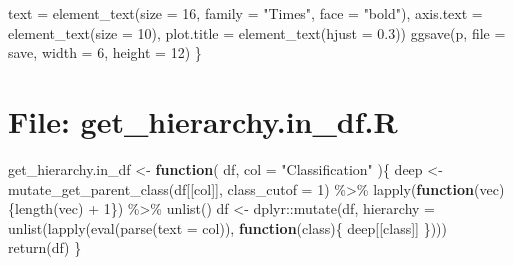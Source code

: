 \documentclass[
]{article}
\newenvironment{Shaded}{\begin{snugshade}}{\end{snugshade}}
\newcommand{\AttributeTok}[1]{\textcolor[rgb]{0.77,0.63,0.00}{#1}}
\newcommand{\ControlFlowTok}[1]{\textcolor[rgb]{0.13,0.29,0.53}{\textbf{#1}}}
\newcommand{\DecValTok}[1]{\textcolor[rgb]{0.00,0.00,0.81}{#1}}
\newcommand{\FloatTok}[1]{\textcolor[rgb]{0.00,0.00,0.81}{#1}}
\newcommand{\FunctionTok}[1]{\textcolor[rgb]{0.00,0.00,0.00}{#1}}
\newcommand{\NormalTok}[1]{#1}
\newcommand{\OtherTok}[1]{\textcolor[rgb]{0.56,0.35,0.01}{#1}}
\newcommand{\SpecialCharTok}[1]{\textcolor[rgb]{0.00,0.00,0.00}{#1}}
\newcommand{\StringTok}[1]{\textcolor[rgb]{0.31,0.60,0.02}{#1}}
\begin{document}
\begin{Shaded}
\begin{Highlighting}[]
            \AttributeTok{text =} \FunctionTok{element\_text}\NormalTok{(}\AttributeTok{size =} \DecValTok{16}\NormalTok{, }\AttributeTok{family =} \StringTok{"Times"}\NormalTok{, }\AttributeTok{face =} \StringTok{"bold"}\NormalTok{),}
            \AttributeTok{axis.text =} \FunctionTok{element\_text}\NormalTok{(}\AttributeTok{size =} \DecValTok{10}\NormalTok{),}
            \AttributeTok{plot.title =} \FunctionTok{element\_text}\NormalTok{(}\AttributeTok{hjust =} \FloatTok{0.3}\NormalTok{))}
    \FunctionTok{ggsave}\NormalTok{(p, }\AttributeTok{file =}\NormalTok{ save, }\AttributeTok{width =} \DecValTok{6}\NormalTok{, }\AttributeTok{height =} \DecValTok{12}\NormalTok{)}
\NormalTok{  \}}
\end{Highlighting}
\end{Shaded}

\hypertarget{file-get_hierarchy.in_df.r}{%
\section{File: get\_hierarchy.in\_df.R}\label{file-get_hierarchy.in_df.r}}

\begin{Shaded}
\begin{Highlighting}[]
\NormalTok{get\_hierarchy.in\_df }\OtherTok{\textless{}{-}} 
  \ControlFlowTok{function}\NormalTok{(}
\NormalTok{           df,}
           \AttributeTok{col =} \StringTok{"Classification"}
\NormalTok{           )\{}
\NormalTok{    deep }\OtherTok{\textless{}{-}} \FunctionTok{mutate\_get\_parent\_class}\NormalTok{(df[[col]], }\AttributeTok{class\_cutof =} \DecValTok{1}\NormalTok{) }\SpecialCharTok{\%\textgreater{}\%} 
      \FunctionTok{lapply}\NormalTok{(}\ControlFlowTok{function}\NormalTok{(vec)\{}\FunctionTok{length}\NormalTok{(vec) }\SpecialCharTok{+} \DecValTok{1}\NormalTok{\}) }\SpecialCharTok{\%\textgreater{}\%} 
      \FunctionTok{unlist}\NormalTok{()}
\NormalTok{    df }\OtherTok{\textless{}{-}}\NormalTok{ dplyr}\SpecialCharTok{::}\FunctionTok{mutate}\NormalTok{(df, }\AttributeTok{hierarchy =} \FunctionTok{unlist}\NormalTok{(}\FunctionTok{lapply}\NormalTok{(}\FunctionTok{eval}\NormalTok{(}\FunctionTok{parse}\NormalTok{(}\AttributeTok{text =}\NormalTok{ col)),}
                                           \ControlFlowTok{function}\NormalTok{(class)\{}
\NormalTok{                                             deep[[class]]}
\NormalTok{                                           \})))}
    \FunctionTok{return}\NormalTok{(df)}
\NormalTok{  \}}
\end{Highlighting}
\end{Shaded}
\end{document}
